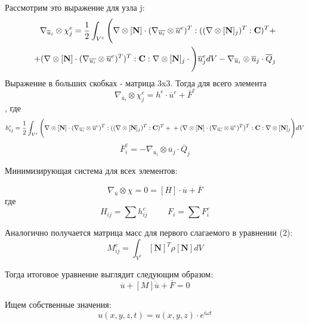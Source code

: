 \documentclass[a4paper,12pt]{article}
\begin{document}
Рассмотрим это выражение для узла j:
\begin{equation}
    \begin{split}
        \nabla_{\overline{u}_i} \otimes \chi^e_j = \frac{1}{2}\int_{V^e} \Bigg( \nabla \otimes [\textbf{N}] \cdot (\nabla_{\overline{u_i}} \otimes \overline{u}^e)^T:((\nabla \otimes[\textbf{N}]_j)^T:\textbf{C})^T + \\ 
        +(\nabla \otimes [\textbf{N}] \cdot (\nabla_{\overline{u_i}} \otimes \overline{u}^e)^T)^T:\textbf{C}:\nabla \otimes [\textbf{N}]_j \cdot  \Bigg)\overline{u}^e_j \space dV - \nabla_{\overline{u}_i} \otimes\overline{u}_j \cdot \overline{Q}_j
    \end{split}
\end{equation}
Выражение в больших скобках - матрица 3x3. Тогда для всего элемента
\begin{equation}
    \nabla_{\overline{u}_i} \otimes \chi^e_j = h^e \cdot \overline{u}^e + \overline{F}^e
\end{equation},
где
\begin{equation}
    h_{ij}^e = \frac{1}{2}\int_{V^e} \Bigg( \nabla \otimes [\textbf{N}] \cdot (\nabla_{\overline{u_i}} \otimes \overline{u}^e)^T:((\nabla \otimes[\textbf{N}]_j)^T:\textbf{C})^T + \\ 
        +(\nabla \otimes [\textbf{N}] \cdot (\nabla_{\overline{u_i}} \otimes \overline{u}^e)^T)^T:\textbf{C}:\nabla \otimes [\textbf{N}]_j \Bigg) dV
\end{equation}
\begin{equation}
    \overline{F}^e_i = - \nabla_{\overline{u}_i} \otimes\overline{u}_j \cdot \overline{Q}_j
\end{equation}

Минимизирующая система для всех элементов:

\begin{equation}
    \nabla_{\overline{u}} \otimes \chi = 0 =[H] \cdot \overline{u} +  \overline{F}
\end{equation}
где 
\begin{equation}
    H_{ij} = \sum h_{ij}^e  \hspace{1cm} F_i = \sum F_i^e
\end{equation}


Аналогично получается матрица масс для первого слагаемого в уравнении (2):
\begin{equation}
    M_{ij}^e = \int_{V^e} [\textbf{N}]^T \rho [\textbf{N}] dV
\end{equation}

Тогда итоговое уравнение выглядит следующим образом:
\begin{equation}
    [H]\overline{u} + [M] \ddot{\overline{u}} + \overline{F} = 0
\end{equation}

Ищем собственные значения:
\begin{equation}
    u(x,y,z,t) = u(x,y,z)\cdot e^{i\omega t}
\end{equation}


\begin{lstlisting}

\end{lstlisting}
\end{document}
